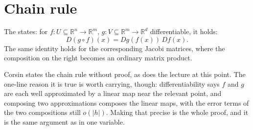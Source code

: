 
\section{Chain rule}
\label{sec:chain_rule}

\begin{theorem}
\label{thm:chain_rule}
The   states: for
$f : U \subseteq \mathbb{R}^n \to \mathbb{R}^m$, $g : V \subseteq \mathbb{R}^m \to \mathbb{R}^d$
differentiable, it holds:
\[D(g\circ f)(x) = Dg(f(x))\,Df(x).\]
The same identity holds for the corresponding Jacobi matrices, where the composition on the
right becomes an ordinary matrix product.
\end{theorem}

\begin{ainote}
Corsin states the chain rule without proof, as does the lecture at this point. The one-line
reason it is true is worth carrying, though: differentiability says $f$ and $g$ are each well
approximated by a linear map near the relevant point, and composing two approximations composes
the linear maps, with the error terms of the two compositions still $o(|h|)$. Making that
precise is the whole proof, and it is the same argument as in one variable.
\end{ainote}

